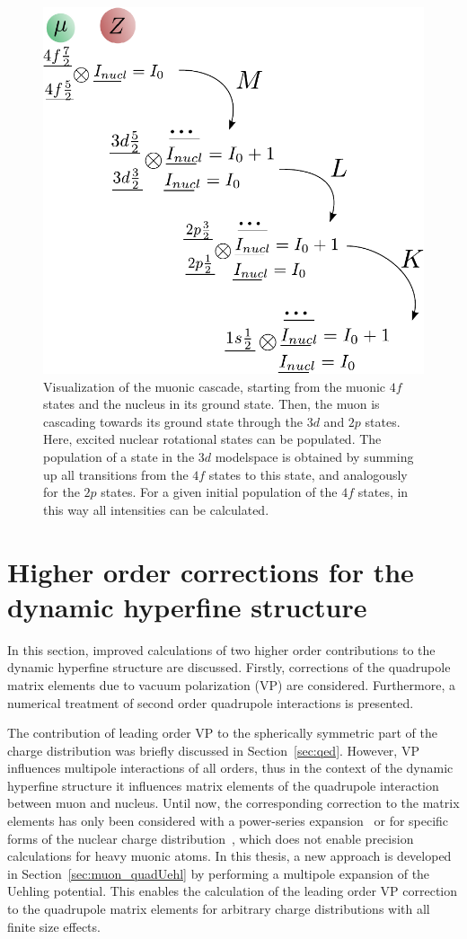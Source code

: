 %
\begin{figure}%
\centering
\includegraphics[width=0.62\linewidth]{pics/cascade.pdf}%
\caption{Visualization of the muonic cascade, starting from the muonic $4f$ states and the nucleus in its ground state. Then, the muon is cascading towards its ground state through the $3d$ and $2p$ states. Here, excited nuclear rotational states can be populated. The population of a state in the $3d$ modelspace is obtained by summing up all transitions from the $4f$ states to this state, and analogously for the $2p$ states. For a given initial population of the $4f$ states, in this way all intensities can be calculated.}%
\label{fig:cascade}%
\end{figure}
%
\newpage
\section{Higher order corrections for the dynamic hyperfine structure}
\label{sec:higherorder}
In this section, improved calculations of two higher order contributions to the dynamic hyperfine structure are discussed. Firstly, corrections of the quadrupole matrix elements due to vacuum polarization (VP) are considered. Furthermore, a numerical treatment of second order quadrupole interactions is presented.

The contribution of leading order VP to the spherically symmetric part of the charge distribution was briefly discussed in Section~\ref{sec:qed}. However, VP influences multipole interactions of all orders, thus in the context of the dynamic hyperfine structure it influences matrix elements of the quadrupole interaction between muon and nucleus. Until now, the corresponding correction to the matrix elements has only been considered with a power-series expansion~\cite{Fricke1969vp,zehnder1975} or for specific forms of the nuclear charge distribution~\cite{pearson1963}, which does not enable precision calculations for heavy muonic atoms. In this thesis, a new approach is developed in Section~\ref{sec:muon_quadUehl} by performing a multipole expansion of the Uehling potential. This enables the calculation of the leading order VP correction to the quadrupole matrix elements for arbitrary charge distributions with all finite size effects.

